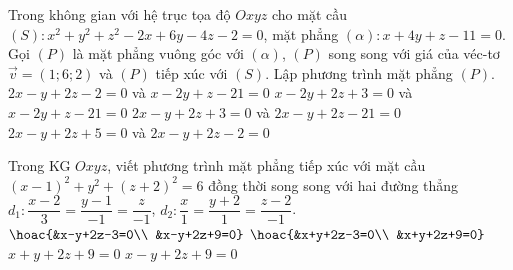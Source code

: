 \begin{ex}%
	Trong không gian với hệ trục tọa độ $Oxyz$ cho mặt cầu $(S)\colon x^2+y^2+z^2-2x+6y-4z-2=0$, mặt phẳng $(\alpha)\colon x+4y+z-11=0$. Gọi $(P)$ là mặt phẳng vuông góc với $(\alpha)$, $(P)$ song song với giá của véc-tơ $\overrightarrow{v}=(1;6;2)$ và $(P)$ tiếp xúc với $(S)$. Lập phương trình mặt phẳng $(P)$.
	\choice
	{$2x-y+2z-2=0$ và $x-2y+z-21=0$}
	{$x-2y+2z+3=0$ và $x-2y+z-21=0$}
	{\True $2x-y+2z+3=0$ và $2x-y+2z-21=0$}
	{$2x-y+2z+5=0$ và $2x-y+2z-2=0$}
\end{ex}
\begin{ex}%
	Trong KG $Oxyz$, viết phương trình mặt phẳng tiếp xúc với mặt cầu $(x-1)^2+y^2+(z+2)^2=6$ đồng thời song song với hai đường thẳng $d_1\colon \dfrac{x-2}{3}=\dfrac{y-1}{-1}=\dfrac{z}{-1}$, $d_2\colon \dfrac{x}{1}=\dfrac{y+2}{1}=\dfrac{z-2}{-1}$.
	\choice
	{$\hoac{&x-y+2z-3=0\\ &x-y+2z+9=0}$}
	{\True $\hoac{&x+y+2z-3=0\\ &x+y+2z+9=0}$}
	{$x+y+2z+9=0$}
	{$x-y+2z+9=0$}
\end{ex}
